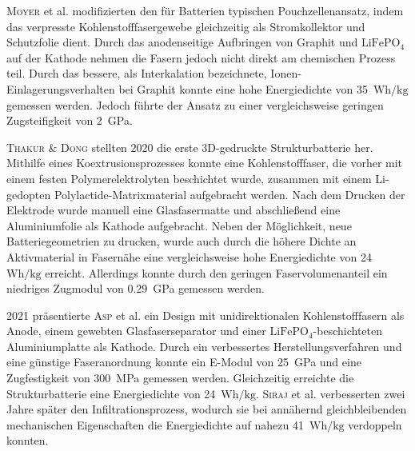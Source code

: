 \textsc{Moyer} et al. \cite{Moyer2020} modifizierten den für Batterien typischen Pouchzellenansatz, indem das verpresste Kohlenstofffasergewebe gleichzeitig als Stromkollektor und Schutzfolie dient. Durch das anodenseitige Aufbringen von Graphit und $\text{LiFePO}_\text{4}$ auf der Kathode nehmen die Fasern jedoch nicht direkt am chemischen Prozess teil. Durch das bessere, als Interkalation bezeichnete, Ionen-Einlagerungsverhalten bei Graphit konnte eine hohe Energiedichte von 35~$\si{\watt \hour \per \kg}$ gemessen werden. Jedoch führte der Ansatz zu einer vergleichsweise geringen Zugsteifigkeit von 2~GPa.

\textsc{Thakur \& Dong} \cite{Thakur2020} stellten 2020 die erste 3D-gedruckte Strukturbatterie her. Mithilfe eines Koextrusionsprozesses konnte eine Kohlenstofffaser, die vorher mit einem festen Polymerelektrolyten beschichtet wurde, zusammen mit einem Li-gedopten Polylactide-Matrixmaterial aufgebracht werden. Nach dem Drucken der Elektrode wurde manuell eine Glasfasermatte und abschließend eine Aluminiumfolie als Kathode aufgebracht. Neben der Möglichkeit, neue Batteriegeometrien zu drucken, wurde auch durch die höhere Dichte an Aktivmaterial in Fasernähe eine vergleichsweise hohe Energiedichte von 24~$\si{\watt \hour \per \kg}$ erreicht. Allerdings konnte durch den geringen Faservolumenanteil ein niedriges Zugmodul von 0.29~GPa gemessen werden.

2021 präsentierte \textsc{Asp} et al. \cite{Asp2021} ein Design mit unidirektionalen Kohlenstofffasern als Anode, einem gewebten Glasfaserseparator und einer $\text{LiFePO}_\text{4}$-beschichteten Aluminiumplatte als Kathode. Durch ein verbessertes Herstellungsverfahren und eine günstige Faseranordnung konnte ein E-Modul von 25~GPa und eine Zugfestigkeit von 300~MPa gemessen werden. Gleichzeitig erreichte die Strukturbatterie eine Energiedichte von 24~$\si{\watt \hour \per \kg}$. \textsc{Siraj} et al. \cite{Siraj2023} verbesserten zwei Jahre später den Infiltrationsprozess, wodurch sie bei annähernd gleichbleibenden mechanischen Eigenschaften die Energiedichte auf nahezu 41~$\si{\watt \hour \per \kg}$ verdoppeln konnten.



